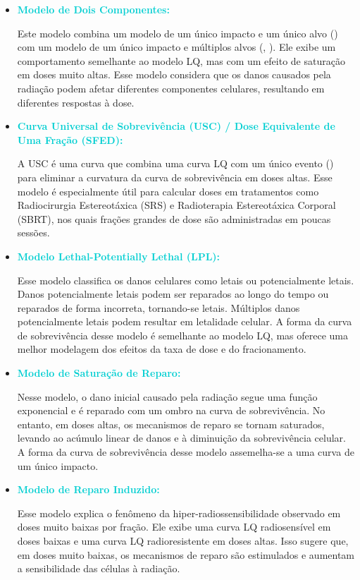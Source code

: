 \documentclass[11pt,a4paper]{article}
\begin{document}
	\begin{itemize}
		\item \textcolor{DarkTurquoise}{\textbf{Modelo de Dois Componentes:}}
		
		Este modelo combina um modelo de um único impacto e um único alvo () com um modelo de um único impacto e múltiplos alvos (, ). Ele exibe um comportamento semelhante ao modelo LQ, mas com um efeito de saturação em doses muito altas. Esse modelo considera que os danos causados pela radiação podem afetar diferentes componentes celulares, resultando em diferentes respostas à dose.
		
		\item \textcolor{DarkTurquoise}{\textbf{Curva Universal de Sobrevivência (USC) / Dose Equivalente de Uma Fração (SFED):}}
		
		A USC é uma curva que combina uma curva LQ com um único evento () para eliminar a curvatura da curva de sobrevivência em doses altas. Esse modelo é especialmente útil para calcular doses em tratamentos como Radiocirurgia Estereotáxica (SRS) e Radioterapia Estereotáxica Corporal (SBRT), nos quais frações grandes de dose são administradas em poucas sessões.
		
		\item \textcolor{DarkTurquoise}{\textbf{Modelo Lethal-Potentially Lethal (LPL):}}
		
		Esse modelo classifica os danos celulares como letais ou potencialmente letais. Danos potencialmente letais podem ser reparados ao longo do tempo ou reparados de forma incorreta, tornando-se letais. Múltiplos danos potencialmente letais podem resultar em letalidade celular. A forma da curva de sobrevivência desse modelo é semelhante ao modelo LQ, mas oferece uma melhor modelagem dos efeitos da taxa de dose e do fracionamento.
		
		\item \textcolor{DarkTurquoise}{\textbf{Modelo de Saturação de Reparo:}}
		
		Nesse modelo, o dano inicial causado pela radiação segue uma função exponencial e é reparado com um ombro na curva de sobrevivência. No entanto, em doses altas, os mecanismos de reparo se tornam saturados, levando ao acúmulo linear de danos e à diminuição da sobrevivência celular. A forma da curva de sobrevivência desse modelo assemelha-se a uma curva de um único impacto.
		
		\item \textcolor{DarkTurquoise}{\textbf{Modelo de Reparo Induzido:}}
		
		Esse modelo explica o fenômeno da hiper-radiossensibilidade observado em doses muito baixas por fração. Ele exibe uma curva LQ radiosensível em doses baixas e uma curva LQ radioresistente em doses altas. Isso sugere que, em doses muito baixas, os mecanismos de reparo são estimulados e aumentam a sensibilidade das células à radiação.
	\end{itemize}




\end{document}
